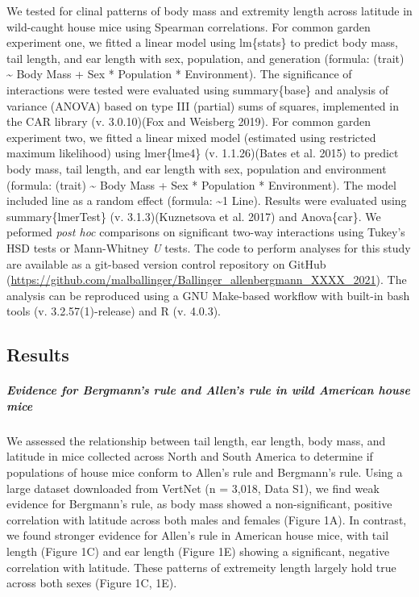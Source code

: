 \documentclass[]{article}
\let\oldsubparagraph\subparagraph
\renewcommand{\subparagraph}[1]{\oldsubparagraph{#1}\mbox{}}
\begin{document}
We tested for clinal patterns of body mass and extremity length across
latitude in wild-caught house mice using Spearman correlations. For
common garden experiment one, we fitted a linear model using lm\{stats\}
to predict body mass, tail length, and ear length with sex, population,
and generation (formula: (trait) \textasciitilde{} Body Mass + Sex *
Population * Environment). The significance of interactions were tested
were evaluated using summary\{base\} and analysis of variance (ANOVA)
based on type III (partial) sums of squares, implemented in the CAR
library (v. 3.0.10)(Fox and Weisberg 2019). For common garden experiment
two, we fitted a linear mixed model (estimated using restricted maximum
likelihood) using lmer\{lme4\} (v. 1.1.26)(Bates et al. 2015) to predict
body mass, tail length, and ear length with sex, population and
environment (formula: (trait) \textasciitilde{} Body Mass + Sex *
Population * Environment). The model included line as a random effect
(formula: \textasciitilde{}1 \textbar{} Line). Results were evaluated
using summary\{lmerTest\} (v. 3.1.3)(Kuznetsova et al. 2017) and
Anova\{car\}. We peformed \emph{post hoc} comparisons on significant
two-way interactions using Tukey's HSD tests or Mann-Whitney \emph{U}
tests. The code to perform analyses for this study are available as a
git-based version control repository on GitHub
(\url{https://github.com/malballinger/Ballinger_allenbergmann_XXXX_2021}).
The analysis can be reproduced using a GNU Make-based workflow with
built-in bash tools (v. 3.2.57(1)-release) and R (v. 4.0.3).

\vspace{5mm}

\hypertarget{results}{%
\subsection{Results}\label{results}}

\hypertarget{evidence-for-bergmanns-rule-and-allens-rule-in-wild-american-house-mice}{%
\subparagraph{\texorpdfstring{\emph{Evidence for Bergmann's rule and
Allen's rule in wild American house
mice}}{Evidence for Bergmann's rule and Allen's rule in wild American house mice}}\label{evidence-for-bergmanns-rule-and-allens-rule-in-wild-american-house-mice}}

We assessed the relationship between tail length, ear length, body mass,
and latitude in mice collected across North and South America to
determine if populations of house mice conform to Allen's rule and
Bergmann's rule. Using a large dataset downloaded from VertNet (n =
3,018, Data S1), we find weak evidence for Bergmann's rule, as body mass
showed a non-significant, positive correlation with latitude across both
males and females (Figure 1A). In contrast, we found stronger evidence
for Allen's rule in American house mice, with tail length (Figure 1C)
and ear length (Figure 1E) showing a significant, negative correlation
with latitude. These patterns of extremeity length largely hold true
across both sexes (Figure 1C, 1E).
\end{document}
